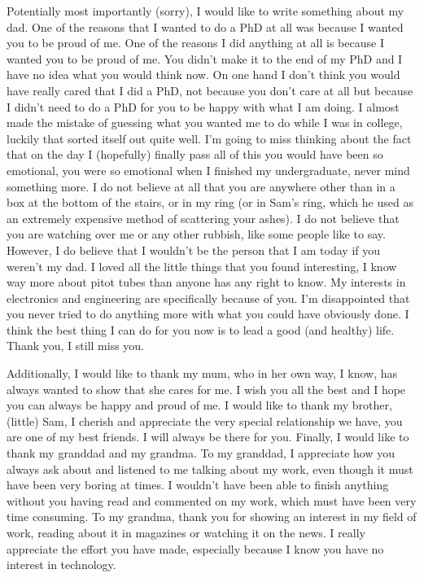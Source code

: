 \begin{acknowledgements}
    Potentially most importantly (sorry), I would like to write something about my dad. One of the reasons that I wanted to do a \gls{PhD} at all was because I wanted you to be proud of me. One of the reasons I did anything at all is because I wanted you to be proud of me. You didn't make it to the end of my \gls{PhD} and I have no idea what you would think now. On one hand I don't think you would have really cared that I did a \gls{PhD}, not because you don't care at all but because I didn't need to do a \gls{PhD} for you to be happy with what I am doing. I almost made the mistake of guessing what you wanted me to do while I was in college, luckily that sorted itself out quite well. I'm going to miss thinking about the fact that on the day I (hopefully) finally pass all of this you would have been so emotional, you were so emotional when I finished my undergraduate, never mind something more. I do not believe at all that you are anywhere other than in a box at the bottom of the stairs, or in my ring (or in Sam's ring, which he used as an extremely expensive method of scattering your ashes). I do not believe that you are watching over me or any other rubbish, like some people like to say. However, I do believe that I wouldn't be the person that I am today if you weren't my dad. I loved all the little things that you found interesting, I know way more about pitot tubes than anyone has any right to know. My interests in electronics and engineering are specifically because of you. I'm disappointed that you never tried to do anything more with what you could have obviously done. I think the best thing I can do for you now is to lead a good (and healthy) life. Thank you, I still miss you.

    Additionally, I would like to thank my mum, who in her own way, I know, has always wanted to show that she cares for me. I wish you all the best and I hope you can always be happy and proud of me. I would like to thank my brother, (little) Sam, I cherish and appreciate the very special relationship we have, you are one of my best friends. I will always be there for you. Finally, I would like to thank my granddad and my grandma. To my granddad, I appreciate how you always ask about and listened to me talking about my work, even though it must have been very boring at times. I wouldn't have been able to finish anything without you having read and commented on my work, which must have been very time consuming. To my grandma, thank you for showing an interest in my field of work, reading about it in magazines or watching it on the news. I really appreciate the effort you have made, especially because I know you have no interest in technology.


\end{acknowledgements}
